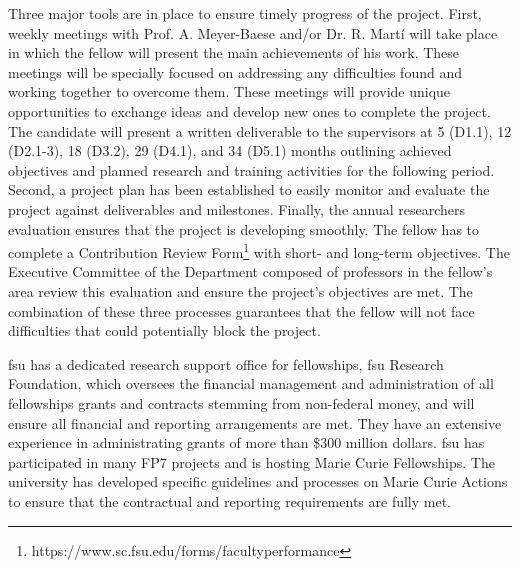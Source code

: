 Three major tools are in place to ensure timely progress of the project.
First, weekly meetings with Prof. A. Meyer-Baese and/or Dr. R. Mart\'i will take place in which the fellow will present the main achievements of his work.
These meetings will be specially focused on addressing any difficulties found and working together to overcome them.
These meetings will provide unique opportunities to exchange ideas and develop new ones to complete the project.
The candidate will present a written deliverable to the supervisors at 5 (D1.1), 12 (D2.1-3), 18 (D3.2), 29 (D4.1), and 34 (D5.1) months outlining achieved objectives and planned research and training activities for the following period.
Second, a project plan has been established to easily monitor and evaluate the project against deliverables and milestones.
Finally, the annual researchers evaluation ensures that the project is developing smoothly.
The fellow has to complete a Contribution Review Form\footnote{https://www.sc.fsu.edu/forms/facultyperformance} with short- and long-term objectives.
The Executive Committee of the Department composed of professors in the fellow's area review this evaluation and ensure the project's objectives are met.
The combination of these three processes guarantees that the fellow will not face difficulties that could potentially block the project.

\ac{fsu} has a dedicated research support office for fellowships, \ac{fsu} Research Foundation, which oversees the financial management and administration of all fellowships grants and contracts stemming from non-federal money, and will ensure all financial and reporting arrangements are met.
They have an extensive experience in administrating grants of more than \$300 million dollars.
\ac{fsu} has participated in many FP7 projects and is hosting Marie Curie Fellowships.
The university has developed specific guidelines and processes on Marie Curie Actions to ensure that the contractual and reporting requirements are fully met.

